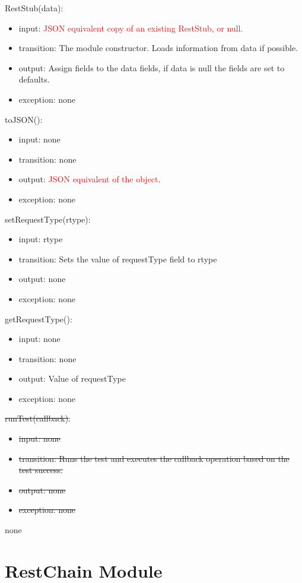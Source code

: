 \documentclass[12pt, titlepage]{article}
\newcommand{\newAccessProgram}[5]{
	\noindent #1:
		\begin{itemize}
		    \item input: #2
			\item transition: #3
			\item output: #4
			\item exception: #5
		\end{itemize}
}
\newcommand{\oldAccessProgram}[5]{
	\noindent \sout{#1}:
		\begin{itemize}
		    \item \sout{input: #2}
			\item \sout{transition: #3}
			\item \sout{output: #4}
			\item \sout{exception: #5}
		\end{itemize}
}
\begin{document}
	{%
		\newAccessProgram{RestStub(data)}
			{%
				\textcolor{red}{JSON equivalent copy of an existing RestStub, or null.}
			}
			{%
				The module constructor. Loads information from data if possible.
			}
			{%
				Assign fields to the data fields, if data is null the fields are set to defaults.
			}
			{%
				none
			}
		\newAccessProgram{toJSON()}
			{%
				none
			}
			{%
				none
			}
			{%
				\textcolor{red}{JSON equivalent of the object.}
			}
			{%
				none
			}
		\newAccessProgram{setRequestType(rtype)}
			{%
				rtype
			}
			{%
				Sets the value of requestType field to rtype
			}
			{%
				none
			}
			{%
				none
			}
		\newAccessProgram{getRequestType()}
			{%
				none
			}
			{%
				none
			}
			{%
				Value of requestType
			}
			{%
				none
			}
			\oldAccessProgram{runTest(callback)}
			{%
				none
			}
			{%
				Runs the test and executes the callback operation based on the test success.
			}
			{%
				none
			}
			{%
				none
			}
	}
	{%
		none
	}
	
\newpage


\section {RestChain Module}

\label{RestChain}
\end{document}
